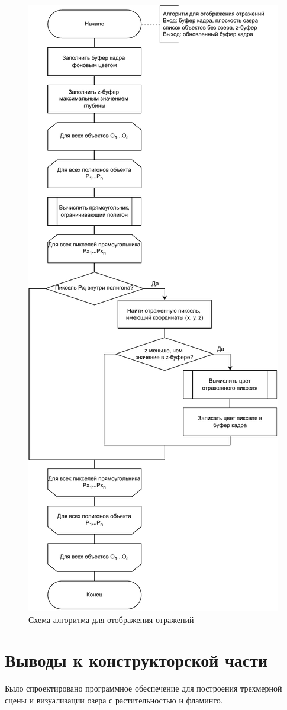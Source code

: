 \begin{figure}[h!]
	\centering
	\includegraphics[width=0.42\linewidth]{img/reflect}
	\caption{Схема алгоритма для отображения отражений}
	\label{fig:reflect}
\end{figure}
\clearpage


\section{Выводы к конструкторской части}

Было спроектировано программное обеспечение для построения трехмерной сцены и визуализации озера с растительностью и фламинго.